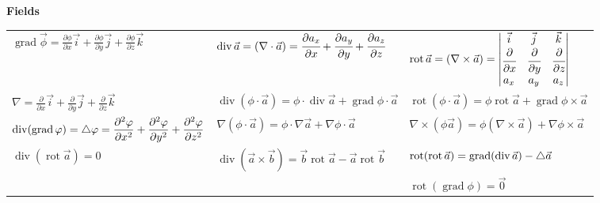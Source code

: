 \begin{center}
    \textbf{Fields}
\end{center}


\begin{tabular}{|l|l|l|}
    $\displaystyle\operatorname{grad}{\vec{\phi}} = \frac{\partial{\phi}}{\partial{x}}\vec{i}+\frac{\partial{\phi}}{\partial{y}}\vec{j}+\frac{\partial{\phi}}{\partial{z}}\vec{k}$
    &
    $\displaystyle \operatorname{div}\vec{a} = (\nabla\cdot\vec{a}) = \cfrac{\partial a_x}{\partial x} + \cfrac{\partial a_y}{\partial y}+\cfrac{\partial a_z}{\partial z}$
    & 
    $\displaystyle\operatorname{rot}\vec{a} = (\nabla\times\vec{a})=
    \begin{vmatrix}
    \vec{i} & \vec{j} & \vec{k} \\
    \cfrac{\partial}{\partial x} & \cfrac{\partial}{\partial y} &
    \cfrac{\partial}{\partial z} \\
    a_x & a_y & a_z
    \end{vmatrix}$
    \\
    
    $\displaystyle\nabla=\frac{\partial}{\partial{x}}\vec{i}+\frac{\partial}{\partial{y}}\vec{j}+\frac{\partial}{\partial{z}}\vec{k}$
    &
    $\displaystyle\operatorname{div}(\phi\cdot\vec{a}) = \phi\cdot\operatorname{div}\vec{a}+\operatorname{grad}{\phi}\cdot\vec{a}$
    & 
    $\displaystyle\operatorname{rot}(\phi\cdot\vec{a}) = \phi\operatorname{rot}\vec{a}+\operatorname{grad}\phi\times\vec{a}$
    \\
    
    $\displaystyle\operatorname{div}(\operatorname{grad}\varphi) = \mathop{}\!\mathbin\bigtriangleup\varphi = \frac{\partial^2\varphi}{\partial{x^2}} + \frac{\partial^2\varphi}{\partial{y^2}} + \frac{\partial^2\varphi}{\partial{z^2}}$
    &
    $\displaystyle\nabla{(\phi\cdot\vec{a})} = \phi\cdot\nabla\vec{a}+\nabla\phi\cdot\vec{a}$
    &
    $\displaystyle\nabla\times(\phi\vec{a}) = \phi(\nabla\times\vec{a})+\nabla\phi\times\vec{a}$
    \\
    
    $\displaystyle\operatorname{div}(\operatorname{rot}\vec{a}) = 0$
    &
    $\displaystyle\operatorname{div}(\vec{a}\times\vec{b}) = \vec{b}\operatorname{rot}\vec{a}-\vec{a}\operatorname{rot}\vec{b}$
    & 
    $\displaystyle\operatorname{rot}(\operatorname{rot}\vec{a}) = \operatorname{grad}(\operatorname{div}\vec{a}) - \mathop{}\!\mathbin\bigtriangleup\vec{a}$
    \\
    
    &
    &
    $\displaystyle\operatorname{rot}(\operatorname{grad}\phi) = \vec{0}$
    \\
\end{tabular}

